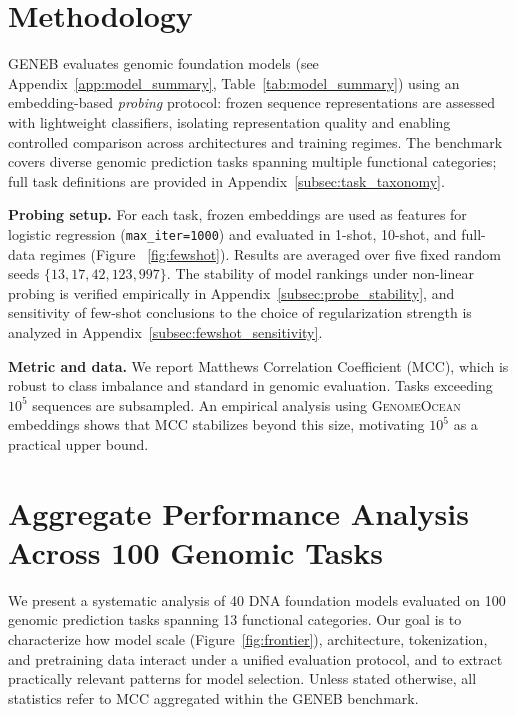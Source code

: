 \documentclass{llmxive}
\begin{document}
\section{Methodology}

GENEB evaluates genomic foundation models (see Appendix~\ref{app:model_summary}, Table~\ref{tab:model_summary}) using an embedding-based \emph{probing} protocol: frozen sequence representations are assessed with lightweight classifiers, isolating representation quality and enabling controlled comparison across architectures and training regimes. The benchmark covers diverse genomic prediction tasks spanning multiple functional categories; full task definitions are provided in Appendix~\ref{subsec:task_taxonomy}.

\textbf{Probing setup.}
For each task, frozen embeddings are used as features for logistic regression (\texttt{max\_iter=1000}) and evaluated in 1-shot, 10-shot, and full-data regimes (Figure ~\ref{fig:fewshot}). Results are averaged over five fixed random seeds $\{13, 17, 42, 123, 997\}$. The stability of model rankings under non-linear probing is verified
empirically in Appendix~\ref{subsec:probe_stability}, and sensitivity of
few-shot conclusions to the choice of regularization strength is
analyzed in Appendix~\ref{subsec:fewshot_sensitivity}.

\textbf{Metric and data.} We report Matthews Correlation Coefficient (MCC), which is robust to class imbalance and standard in genomic evaluation. Tasks exceeding $10^5$ sequences are subsampled. An empirical analysis using \textsc{GenomeOcean} embeddings shows
that MCC stabilizes beyond this size, motivating $10^5$ as a
practical upper bound.

\section{Aggregate Performance Analysis Across 100 Genomic Tasks}
\label{sec:results}

We present a systematic analysis of 40 DNA foundation models evaluated
on 100 genomic prediction tasks spanning 13 functional categories. Our
goal is to characterize how model scale (Figure~\ref{fig:frontier}),
architecture, tokenization, and pretraining data interact under a
unified evaluation protocol, and to extract practically relevant
patterns for model selection. Unless stated otherwise, all statistics
refer to MCC aggregated within the GENEB benchmark.
\end{document}
